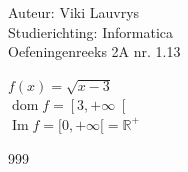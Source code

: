 \documentclass[a4paper]{article}
\begin{document}
  
\noindent \large Auteur: Viki Lauvrys        \\
\noindent \large Studierichting: Informatica \\
\noindent \large Oefeningenreeks 2A nr. 1.13 \\

\medskip

\normalsize


$f(x)=\sqrt{x-3}$ \\

$\operatorname{dom} f= \left[ 3, +\infty \right[ $\\

$ \operatorname{Im} f= [0, +\infty[ = \mathbb{R}^{+} $\\


\begin{thebibliography}{999}
\end{thebibliography}
\end{document}
